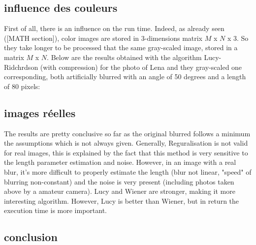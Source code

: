 \subsection{influence des couleurs}

First of all, there is an influence on the run time. Indeed, as already seen ([MATH section]), color images are stored in 3-dimensions matrix $M$ x $N$ x $3$. So they take longer to be processed that the same gray-scaled image, stored in a matrix $M$ x $N$.
Below are the results obtained with the algorithm Lucy-Ridchrdson (with compression) for the photo of Lena and they gray-scaled one corresponding, both artificially blurred with an angle of 50 degrees and a length of 80 pixels:


 

\subsection{images réelles}

 
The results are pretty conclusive so far as the original blurred follows a minimum the assumptions which is not always given. Generally, Reguralisation is not valid for real images, this is explained by the fact that this method is very sensitive to the length parameter estimation and noise. However, in an image with a real blur, it's more difficult to properly estimate the length (blur not linear, "speed" of blurring non-constant) and the noise is very present (including photos taken above by a amateur camera). Lucy and Wiener are stronger, making it more interesting algorithm. However, Lucy is better than Wiener, but in return the execution time is more important.

\subsection{conclusion}